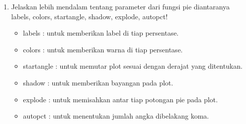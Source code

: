 \begin{enumerate}
		\item Jelaskan lebih mendalam tentang parameter dari fungsi pie diantaranya labels, colors, startangle, shadow, explode, autopct!
 
			 \begin{itemize}
				\item labels : untuk memberikan label di tiap persentase.
				\item colors : untuk memberikan warna di tiap persentase.
				\item startangle : untuk memutar plot sesuai dengan derajat yang ditentukan.
				\item shadow : untuk memberikan bayangan pada plot.
				\item explode : untuk memisahkan antar tiap potongan pie pada plot.
				\item autopct : untuk menentukan jumlah angka dibelakang koma.
			 \end{itemize}
		
	\end{enumerate}
	
